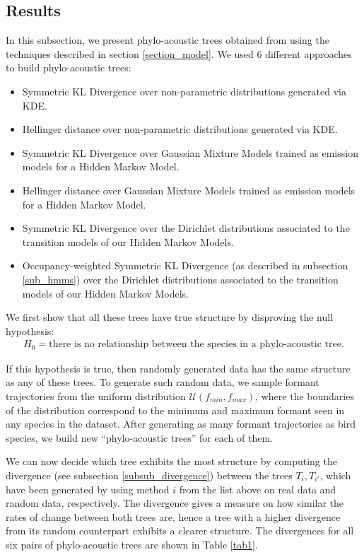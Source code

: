\documentclass[pdftex,11pt,a4paper]{article}
\theoremstyle{definition}
\theoremstyle{remark}
\begin{document}
\subsection{Results}
\label{sub_results}
In this subsection, we present phylo-acoustic trees obtained from using the techniques described in section \ref{section_model}. We used 6 different approaches to build phylo-acoustic trees:
\begin{itemize}
\item Symmetric KL Divergence over non-parametric distributions generated via KDE.
\item Hellinger distance over non-parametric distributions generated via KDE.
\item Symmetric KL Divergence over Gaussian Mixture Models trained as emission models for a Hidden Markov Model.
\item Hellinger distance over Gaussian Mixture Models trained as emission models for a Hidden Markov Model.
\item Symmetric KL Divergence over the Dirichlet distributions associated to the transition models of our Hidden Markov Models.
\item Occupancy-weighted Symmetric KL Divergence (as described in subsection \ref{sub_hmms}) over the Dirichlet distributions associated to the transition models of our Hidden Markov Models.
\end{itemize}
\par We first show that all these trees have true structure by 
disproving the null hypothesis:
\begin{align*}
H_0 = \text{there is no relationship between the species in a phylo-acoustic tree.}
\end{align*}
\par If this hypothesis is true, then randomly generated data has the same structure as any of these trees. To generate such random data, we sample formant trajectories from the uniform distribution $\mathcal{U}(f_{min}, f_{max})$, where the boundaries of the distribution correspond to the minimum and maximum formant seen in any species in the dataset. After generating as many formant trajectories as bird species, we build new ``phylo-acoustic trees'' for each of them.
\par We can now decide which tree exhibits the most structure by computing the divergence (see subsection \ref{subsub_divergence}) between the trees $T_i, T_{i'}$, which have been generated by using method $i$ from the list above on real data and random data, respectively. The divergence gives a measure on how similar the rates of change between both trees are, hence a tree with a higher divergence from its random counterpart exhibits a clearer structure. The divergences for all six pairs of phylo-acoustic trees are shown in Table \ref{tab1}.
\end{document}
